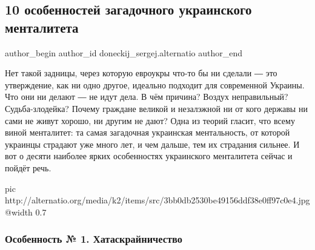  
 
 
 
 
\subsection{10 особенностей загадочного украинского менталитета}
\label{sec:18_09_2020.stz.ru.alternatio_org.1.ukr_mentalitet}

\ifcmt
 author_begin
   author_id doneckij_sergej.alternatio
 author_end
\fi

Нет такой задницы, через которую евроукры что-то бы ни сделали ― это
утверждение, как ни одно другое, идеально подходит для современной Украины. Что
они ни делают ― не идут дела. В чём причина? Воздух неправильный?
Судьба-злодейка? Почему граждане великой и незалэжной ни от кого державы ни
сами не живут хорошо, ни другим не дают? Одна из теорий гласит, что всему виной
менталитет: та самая загадочная украинская ментальность, от которой украинцы
страдают уже много лет, и чем дальше, тем их страдания сильнее. И вот о десяти
наиболее ярких особенностях украинского менталитета сейчас и пойдёт речь.

\ifcmt
  pic http://alternatio.org/media/k2/items/src/3bb0db2530be49156ddf38e0ff97c0e4.jpg
  @width 0.7
\fi

\subsubsection{Особенность № 1. Хатаскрайничество}


